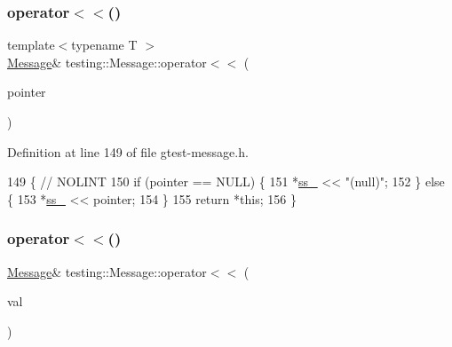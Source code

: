 \subsubsection{\texorpdfstring{operator$<$$<$()}{operator<<()}\hspace{0.1cm}{\footnotesize\ttfamily [2/6]}}
{\footnotesize\ttfamily template$<$typename T $>$ \\
\hyperlink{classtesting_1_1Message}{Message}\& testing\+::\+Message\+::operator$<$$<$ (\begin{DoxyParamCaption}\item[{T $\ast$const \&}]{pointer }\end{DoxyParamCaption})\hspace{0.3cm}{\ttfamily [inline]}}



Definition at line 149 of file gtest-\/message.\+h.


\begin{DoxyCode}
149                                                  \{  \textcolor{comment}{// NOLINT}
150     \textcolor{keywordflow}{if} (pointer == NULL) \{
151       *\hyperlink{classtesting_1_1Message_ad46fbddd62cde8526744ae32e3322b76}{ss\_} << \textcolor{stringliteral}{"(null)"};
152     \} \textcolor{keywordflow}{else} \{
153       *\hyperlink{classtesting_1_1Message_ad46fbddd62cde8526744ae32e3322b76}{ss\_} << pointer;
154     \}
155     \textcolor{keywordflow}{return} *\textcolor{keyword}{this};
156   \}
\end{DoxyCode}
\mbox{\label{classtesting_1_1Message_a3a71a1c1c8ea52de5852d75483d41453}} 
\subsubsection{\texorpdfstring{operator$<$$<$()}{operator<<()}\hspace{0.1cm}{\footnotesize\ttfamily [3/6]}}
{\footnotesize\ttfamily \hyperlink{classtesting_1_1Message}{Message}\& testing\+::\+Message\+::operator$<$$<$ (\begin{DoxyParamCaption}\item[{\hyperlink{classtesting_1_1Message_ad398b70e2a11b923cef05c809b0eeb92}{Basic\+Narrow\+Io\+Manip}}]{val }\end{DoxyParamCaption})\hspace{0.3cm}{\ttfamily [inline]}}



